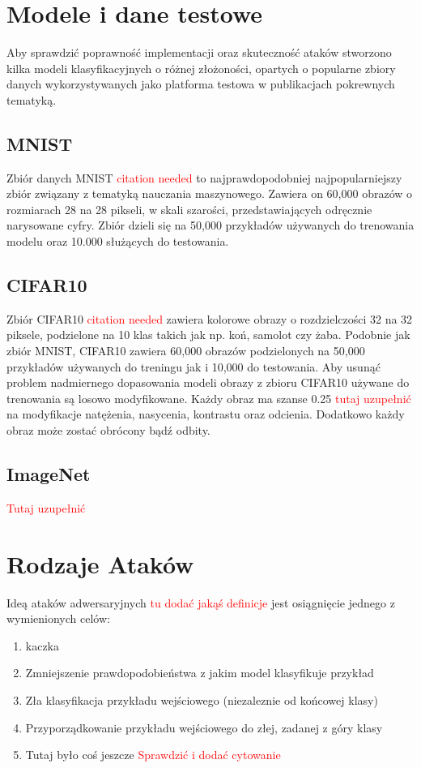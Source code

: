\documentclass{article}
\newcommand\todo[1]{\textcolor{red}{#1}}
\begin{document}
\section{Modele i dane testowe}
Aby sprawdzić poprawność implementacji oraz skuteczność ataków stworzono
kilka modeli klasyfikacyjnych o różnej złożoności, opartych o popularne zbiory danych
wykorzystywanych jako platforma testowa w publikacjach pokrewnych tematyką.

    \subsection{MNIST}
    Zbiór danych MNIST \todo{citation needed} to najprawdopodobniej najpopularniejszy zbiór związany z
    tematyką nauczania maszynowego.
    Zawiera on 60,000 obrazów o rozmiarach 28 na 28 pikseli, w skali szarości, przedstawiających
    odręcznie narysowane cyfry. Zbiór dzieli się na 50,000 przykładów używanych do
    trenowania modelu oraz 10.000 służących do testowania.

    \subsection{CIFAR10}
    Zbiór CIFAR10 \todo{citation needed} zawiera kolorowe obrazy o rozdzielczości 32 na 32 piksele,
    podzielone na 10 klas takich jak np. koń, samolot czy żaba. Podobnie jak zbiór MNIST, CIFAR10 zawiera
    60,000 obrazów podzielonych na 50,000 przykładów używanych do treningu jak i 10,000 do testowania.
    Aby usunąć problem nadmiernego dopasowania modeli obrazy z zbioru CIFAR10 używane
    do trenowania są losowo modyfikowane. Każdy obraz ma szanse 0.25 \todo{tutaj uzupełnić} na
    modyfikacje natężenia, nasycenia, kontrastu oraz odcienia. Dodatkowo każdy obraz może zostać obrócony bądź odbity.

    \subsection{ImageNet}
    \todo{Tutaj uzupełnić}




\section{Rodzaje Ataków}
Ideą ataków adwersaryjnych \todo{tu dodać jakąś definicje} jest osiągnięcie jednego z wymienionych celów:
\begin{enumerate}
    \item kaczka
    \item Zmniejszenie prawdopodobieństwa z jakim model klasyfikuje przykład
    \item Zła klasyfikacja przykładu wejściowego (niezaleznie od końcowej klasy)
    \item Przyporządkowanie przykładu wejściowego do złej, zadanej z góry klasy
    \item Tutaj było coś jeszcze \todo{Sprawdzić i dodać cytowanie}
\end{enumerate}
\end{document}
